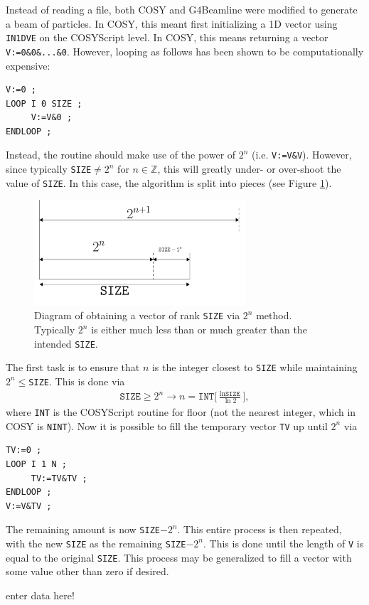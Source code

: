 Instead of reading a file, both COSY and G4Beamline were modified to generate a beam of particles. In COSY, this meant first initializing a 1D vector using \verb|IN1DVE| on the COSYScript level. In COSY, this means returning a vector \verb|V:=0&0&...&0|. However, looping as follows has been shown to be computationally expensive:
\begin{verbatim}
V:=0 ;
LOOP I 0 SIZE ;
     V:=V&0 ;
ENDLOOP ;
\end{verbatim}
Instead, the routine should make use of the power of $2^n$ (i.e. \verb|V:=V&V|). However, since typically \verb|SIZE|$\neq 2^n$ for $n\in\mathbb{Z}$, this will greatly under- or over-shoot the value of \verb|SIZE|. In this case, the algorithm is split into pieces (see Figure \ref{fig:in1dveChunks}).

\begin{figure}[h!]
  \centering
    \includegraphics[width=0.7\textwidth]{Figures/in1dveChunks} 
  \caption{Diagram of obtaining a vector of rank \texttt{SIZE} via $2^n$ method. Typically $2^n$ is either much less than or much greater than the intended \texttt{SIZE}.}
  \label{fig:in1dveChunks}
\end{figure}

The first task is to ensure that $n$ is the integer closest to \texttt{SIZE} while maintaining $2^n\leq$\texttt{SIZE}. This is done via
\begin{align*}
\texttt{SIZE}\geq 2^n \rightarrow n=\texttt{INT}\Big[\frac{\ln\texttt{SIZE}}{\ln 2}\Big],
\end{align*}
where \texttt{INT} is the COSYScript routine for floor (not the nearest integer, which in COSY is \texttt{NINT}). Now it is possible to fill the temporary vector \texttt{TV} up until $2^n$ via
\begin{verbatim}
TV:=0 ;
LOOP I 1 N ;
     TV:=TV&TV ;
ENDLOOP ;
V:=V&TV ;
\end{verbatim}
The remaining amount is now \texttt{SIZE}$-2^n$. This entire process is then repeated, with the new \texttt{SIZE} as the remaining \texttt{SIZE}$-2^n$. This is done until the length of \texttt{V} is equal to the original \texttt{SIZE}. This process may be generalized to fill a vector with some value other than zero if desired.

\label{ssc:miceResults}

enter data here!